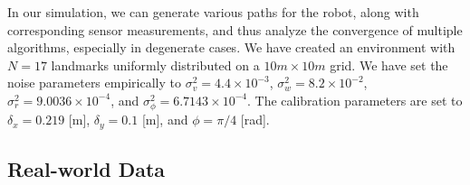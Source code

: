 In our simulation, we can generate various paths for the robot, along with
corresponding sensor measurements, and thus analyze the convergence of multiple
algorithms, especially in degenerate cases. We have created an environment
with $N=17$ landmarks uniformly distributed on a $10m\times 10m$ grid. We have
set the noise parameters empirically to $\sigma^2_v=4.4\times 10^{-3}$,
$\sigma^2_w=8.2\times 10^{-2}$, $\sigma^2_r=9.0036\times 10^{-4}$, and
$\sigma^2_\phi=6.7143\times 10^{-4}$. The calibration parameters are set to
$\delta_x=0.219$ [m], $\delta_y=0.1$ [m], and $\phi=\pi/4$ [rad].

\subsection{Real-world Data}
